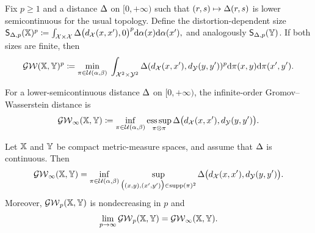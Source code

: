\begin{defn}\label{def-gromov-wasserstein}
Fix $p\geq1$ and a distance $\Delta$ on $[0,+\infty)$ such that $(r,s)\mapsto\Delta(r,s)$ is lower semicontinuous for the usual topology. Define the distortion-dependent size
\(\mathsf S_{\Delta,p}(\mathbb{X})^p \coloneqq \int_{\mathcal{X}\times\mathcal{X}} \Delta\bigl(d_{\mathcal{X}}(x,x'),0\bigr)^p \mathrm{d}\alpha(x)\mathrm{d}\alpha(x'),\)
and analogously $\mathsf S_{\Delta,p}(\mathbb{Y})$. If both sizes are finite, then
\begin{align}
\label{eq-gw-generic}
\operatorname{\mathcal{GW}}( \mathbb{X},\mathbb{Y} )^p \coloneqq
\underset{ \pi \in \mathcal{U}(\alpha,\beta) }{\min}\;
\int_{\mathcal{X}^2 \times \mathcal{Y}^2}
\Delta(d_{\mathcal{X}}(x,x'),d_{\mathcal{Y}}(y,y'))^p
\mathrm{d}\pi(x,y)\mathrm{d}\pi(x',y').
\end{align}
\end{defn}
\begin{defn}\label{def-gromov-wasserstein-infinity}
For a lower-semicontinuous distance $\Delta$ on $[0,+\infty)$, the infinite-order Gromov--Wasserstein distance is
\begin{equation}\label{eq-gw-infinity}
\operatorname{\mathcal{GW}}_\infty(\mathbb{X},\mathbb{Y})
\coloneqq
\inf_{\pi\in\mathcal{U}(\alpha,\beta)}
\operatorname*{ess\,sup}_{\pi\otimes\pi}
\Delta\bigl(d_{\mathcal{X}}(x,x'),d_{\mathcal{Y}}(y,y')\bigr).
\end{equation}
\end{defn}
\begin{prop}\label{prop-gw-infinite-order-limit}
Let $\mathbb{X}$ and $\mathbb{Y}$ be compact metric-measure spaces, and assume that $\Delta$ is continuous. Then
\begin{equation}\label{eq-gw-infinity-support}
\operatorname{\mathcal{GW}}_\infty(\mathbb{X},\mathbb{Y})
=
\inf_{\pi\in\mathcal{U}(\alpha,\beta)}
\sup_{\bigl((x,y),(x',y')\bigr)\in\operatorname{supp}(\pi)^2}
\Delta\bigl(d_{\mathcal{X}}(x,x'),d_{\mathcal{Y}}(y,y')\bigr).
\end{equation}
Moreover, $\operatorname{\mathcal{GW}}_p(\mathbb{X},\mathbb{Y})$ is nondecreasing in $p$ and
\begin{equation}\label{eq-gw-p-to-infinity}
\lim_{p\to\infty}\operatorname{\mathcal{GW}}_p(\mathbb{X},\mathbb{Y})
=
\operatorname{\mathcal{GW}}_\infty(\mathbb{X},\mathbb{Y}).
\end{equation}
\end{prop}
